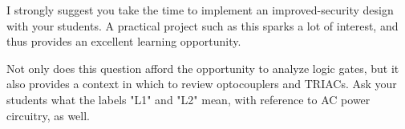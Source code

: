 
I strongly suggest you take the time to implement an improved-security design with your students.  A practical project such as this sparks a lot of interest, and thus provides an excellent learning opportunity.

Not only does this question afford the opportunity to analyze logic gates, but it also provides a context in which to review optocouplers and TRIACs.  Ask your students what the labels "L1" and "L2" mean, with reference to AC power circuitry, as well.




